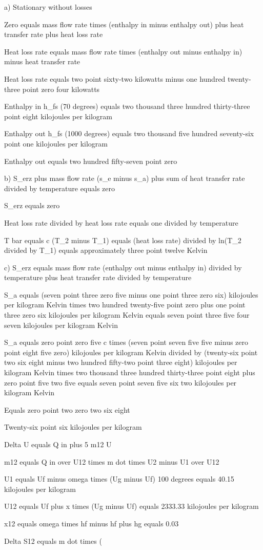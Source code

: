 a) Stationary without losses

Zero equals mass flow rate times (enthalpy in minus enthalpy out) plus heat transfer rate plus heat loss rate

Heat loss rate equals mass flow rate times (enthalpy out minus enthalpy in) minus heat transfer rate

Heat loss rate equals two point sixty-two kilowatts minus one hundred twenty-three point zero four kilowatts

Enthalpy in h_fs (70 degrees) equals two thousand three hundred thirty-three point eight kilojoules per kilogram

Enthalpy out h_fs (1000 degrees) equals two thousand five hundred seventy-six point one kilojoules per kilogram

Enthalpy out equals two hundred fifty-seven point zero

b) S_erz plus mass flow rate (s_e minus s_a) plus sum of heat transfer rate divided by temperature equals zero

S_erz equals zero

Heat loss rate divided by heat loss rate equals one divided by temperature

T bar equals c (T_2 minus T_1) equals (heat loss rate) divided by ln(T_2 divided by T_1) equals approximately three point twelve Kelvin

c) S_erz equals mass flow rate (enthalpy out minus enthalpy in) divided by temperature plus heat transfer rate divided by temperature

S_a equals (seven point three zero five minus one point three zero six) kilojoules per kilogram Kelvin times two hundred twenty-five point zero plus one point three zero six kilojoules per kilogram Kelvin equals seven point three five four seven kilojoules per kilogram Kelvin

S_a equals zero point zero five c times (seven point seven five five minus zero point eight five zero) kilojoules per kilogram Kelvin divided by (twenty-six point two six eight minus two hundred fifty-two point three eight) kilojoules per kilogram Kelvin times two thousand three hundred thirty-three point eight plus zero point five two five equals seven point seven five six two kilojoules per kilogram Kelvin

Equals zero point two zero two six eight

Twenty-six point six kilojoules per kilogram

Delta U equals Q in plus 5 m12 U

m12 equals Q in over U12 times m dot times U2 minus U1 over U12

U1 equals Uf minus omega times (Ug minus Uf) 100 degrees equals 40.15 kilojoules per kilogram

U12 equals Uf plus x times (Ug minus Uf) equals 2333.33 kilojoules per kilogram

x12 equals omega times hf minus hf plus hg equals 0.03

Delta S12 equals m dot times (